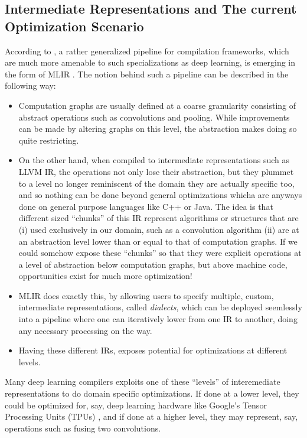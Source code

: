 \documentclass[12pt,a4paper,twoside,openright,bibliography=totocnumbered]{report}
\begin{document}
\subsection{Intermediate Representations and The current Optimization Scenario}
According to \cite{li2020deep}, a rather generalized pipeline for compilation frameworks, which are much more amenable to such specializations as deep learning, is emerging in the form of MLIR \cite{lattner2021mlir}. The notion behind such a pipeline can be described in the following way:
\begin{itemize}
	\item Computation graphs are usually defined at a coarse granularity consisting of abstract operations such as convolutions and pooling. While improvements can be made by altering graphs on this level, the abstraction makes doing so quite restricting.
	\item On the other hand, when compiled to intermediate representations such as LLVM IR, the operations not only lose their abstraction, but they plummet to a level no longer reminiscent of the domain they are actually specific too, and so nothing can be done beyond general optimizations whicha are anyways done on general purpose languages like C++ or Java. The idea is that different sized ``chunks'' of this IR represent algorithms or structures that are (i) used exclusively in our domain, such as a convolution algorithm (ii) are at an abstraction level lower than or equal to that of computation graphs. If we could somehow expose these ``chunks'' so that they were explicit operations at a level of abstraction below computation graphs, but above machine code, opportunities exist for much more optimization!
	\item MLIR does exactly this, by allowing users to specify multiple, custom, intermediate representations, called \textit{dialects}, which can be deployed seemlessly into a pipeline where one can iteratively lower from one IR to another, doing any necessary processing on the way.
	\item Having these different IRs, exposes potential for optimizations at different levels.
\end{itemize}

Many deep learning compilers \cite{hloir} \cite{halideir} exploits one of these ``levels'' of interemediate representations to do domain specific optimizations. If done at a lower level, they could be optimized for, say, deep learning hardware like Google's Tensor Processing Units (TPUs) \cite{jouppi2017datacenter}, and if done at a higher level, they may represent, say, operations such as fusing two convolutions.
\end{document}
